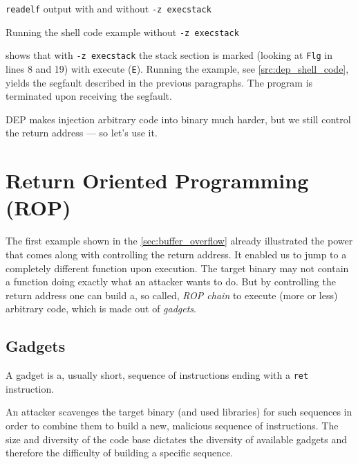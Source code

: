 \documentclass[article]{uibk}
\begin{document}
\begin{listing}[h!]
    \caption{\texttt{readelf} output with and without \texttt{-z execstack}}
    \label{src:dep_readelf}
\end{listing}

\begin{listing}[h!]
    \caption{Running the shell code example without \texttt{-z execstack}}
    \label{src:dep_shell_code}
\end{listing}

 shows that with \texttt{-z execstack} the stack section
is marked (looking at \texttt{Flg} in lines 8 and 19) with execute
(\texttt{E}). Running the example, see \cref{src:dep_shell_code}, yields the
segfault described in the previous paragraphs. The program is terminated upon
receiving the segfault.

DEP makes injection arbitrary code into binary much harder, but we still
control the return address --- so let's use it.

\section{Return Oriented Programming (ROP)}

The first example shown in the \cref{sec:buffer_overflow} already illustrated
the power that comes along with controlling the return address. It enabled us
to jump to a completely different function upon execution. The target binary
may not contain a function doing exactly what an attacker wants to do. But by
controlling the return address one can build a, so called, \textit{ROP chain}
to execute (more or less) arbitrary code, which is made out of
\textit{gadgets}.~\cite{wiki:rop,buchanan2008good,shacham2007}

\subsection{Gadgets}

A gadget is a, usually short, sequence of instructions ending with a
\texttt{ret} instruction.

An attacker scavenges the target binary (and used libraries) for such sequences
in order to combine them to build a new, malicious sequence of instructions.
The size and diversity of the code base dictates the diversity of available
gadgets and therefore the difficulty of building a specific sequence.
\end{document}
